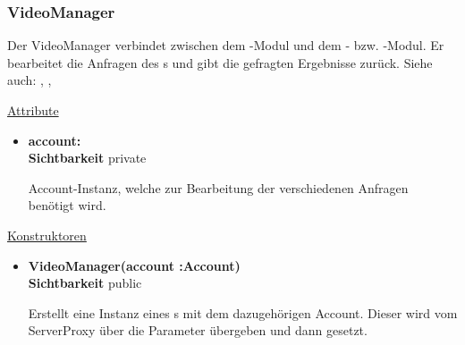 \subsubsection{VideoManager} \label{service:klasse:VideoManager}
Der VideoManager verbindet zwischen dem -Modul und dem - bzw. -Modul. Er bearbeitet die Anfragen des s und gibt die gefragten Ergebnisse zurück.\newline
Siehe auch: , ,  \newline

\underline{Attribute}
\begin{itemize}
\itemsep0pt
\item \textbf{account: } \hfill\\ 
\textbf{Sichtbarkeit} private 

Account-Instanz, welche zur Bearbeitung der verschiedenen Anfragen benötigt wird.

\end{itemize}

\underline{Konstruktoren}
\begin{itemize}
\itemsep0pt
\item \textbf{VideoManager(account :Account)} \hfill\\
\textbf{Sichtbarkeit} public

Erstellt eine Instanz eines s mit dem dazugehörigen Account. Dieser wird vom ServerProxy über die Parameter übergeben und dann gesetzt.
\end{itemize}

